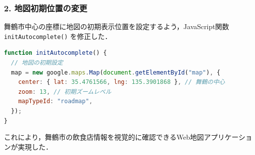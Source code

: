 \subsubsection*{2. 地図初期位置の変更}

舞鶴市中心の座標に地図の初期表示位置を設定するよう，JavaScript関数 \texttt{initAutocomplete()} を修正した．

\begin{lstlisting}[language=javascript]
function initAutocomplete() {
  // 地図の初期設定
  map = new google.maps.Map(document.getElementById("map"), {
    center: { lat: 35.4761566, lng: 135.3901868 }, // 舞鶴の中心
    zoom: 13, // 初期ズームレベル
    mapTypeId: "roadmap",
  });
}
\end{lstlisting}

これにより，舞鶴市の飲食店情報を視覚的に確認できるWeb地図アプリケーションが実現した．
